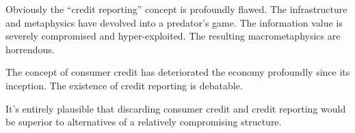 

﻿Obviously the ``credit reporting'' concept is profoundly flawed.  The
infrastructure and metaphysics have devolved into a predator's game.
The information value is severely compromised and hyper-exploited.
The resulting macrometaphysics are horrendous.

The concept of consumer credit has deteriorated the economy profoundly
since its inception.  The existence of credit reporting is debatable.

It's entirely plausible that discarding consumer credit and credit
reporting would be superior to alternatives of a relatively
compromising structure.

\bye
